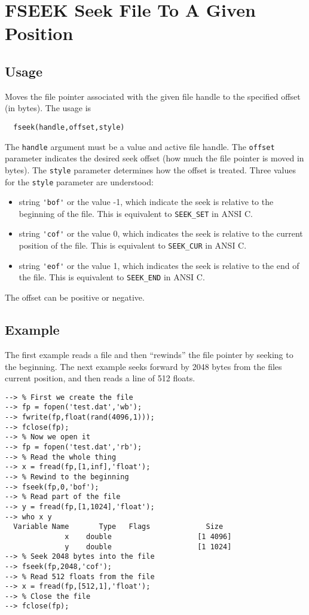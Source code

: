 \section{FSEEK Seek File To A Given Position}

\subsection{Usage}

Moves the file pointer associated with the given file handle to 
the specified offset (in bytes).  The usage is
\begin{verbatim}
  fseek(handle,offset,style)
\end{verbatim}
The \verb|handle| argument must be a value and active file handle.  The
\verb|offset| parameter indicates the desired seek offset (how much the
file pointer is moved in bytes).  The \verb|style| parameter determines
how the offset is treated.  Three values for the \verb|style| parameter
are understood:
\begin{itemize}
\item  string \verb|'bof'| or the value -1, which indicate the seek is relative
to the beginning of the file.  This is equivalent to \verb|SEEK_SET| in
ANSI C.

\item  string \verb|'cof'| or the value 0, which indicates the seek is relative
to the current position of the file.  This is equivalent to 
\verb|SEEK_CUR| in ANSI C.

\item  string \verb|'eof'| or the value 1, which indicates the seek is relative
to the end of the file.  This is equivalent to \verb|SEEK_END| in ANSI
C.

\end{itemize}
The offset can be positive or negative.
\subsection{Example}

The first example reads a file and then ``rewinds'' the file pointer by seeking to the beginning.
The next example seeks forward by 2048 bytes from the files current position, and then reads a line of 512 floats.
\begin{verbatim}
--> % First we create the file
--> fp = fopen('test.dat','wb');
--> fwrite(fp,float(rand(4096,1)));
--> fclose(fp);
--> % Now we open it
--> fp = fopen('test.dat','rb');
--> % Read the whole thing
--> x = fread(fp,[1,inf],'float');
--> % Rewind to the beginning
--> fseek(fp,0,'bof');
--> % Read part of the file
--> y = fread(fp,[1,1024],'float');
--> who x y
  Variable Name       Type   Flags             Size
              x    double                    [1 4096]
              y    double                    [1 1024]
--> % Seek 2048 bytes into the file
--> fseek(fp,2048,'cof');
--> % Read 512 floats from the file
--> x = fread(fp,[512,1],'float');
--> % Close the file
--> fclose(fp);
\end{verbatim}
